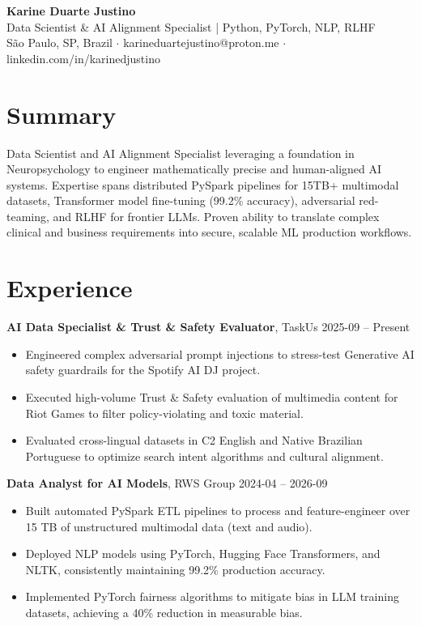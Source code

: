 \documentclass[10pt,a4paper]{article}
\begin{document}
{\LARGE\bfseries Karine Duarte Justino}\\[2pt]
{\large Data Scientist \& AI Alignment Specialist | Python, PyTorch, NLP, RLHF}\\[2pt]
São Paulo, SP, Brazil $\cdot$ karineduartejustino@proton.me $\cdot$ linkedin.com/in/karinedjustino

\section*{Summary}

Data Scientist and AI Alignment Specialist leveraging a foundation in Neuropsychology to engineer mathematically precise and human-aligned AI systems. Expertise spans distributed PySpark pipelines for 15TB+ multimodal datasets, Transformer model fine-tuning (99.2\% accuracy), adversarial red-teaming, and RLHF for frontier LLMs. Proven ability to translate complex clinical and business requirements into secure, scalable ML production workflows.

\section*{Experience}

\textbf{AI Data Specialist \& Trust \& Safety Evaluator}, TaskUs \hfill 2025-09 -- Present\\
\begin{itemize}
  \item Engineered complex adversarial prompt injections to stress-test Generative AI safety guardrails for the Spotify AI DJ project.
  \item Executed high-volume Trust \& Safety evaluation of multimedia content for Riot Games to filter policy-violating and toxic material.
  \item Evaluated cross-lingual datasets in C2 English and Native Brazilian Portuguese to optimize search intent algorithms and cultural alignment.
\end{itemize}

\textbf{Data Analyst for AI Models}, RWS Group \hfill 2024-04 -- 2026-09\\
\begin{itemize}
  \item Built automated PySpark ETL pipelines to process and feature-engineer over 15 TB of unstructured multimodal data (text and audio).
  \item Deployed NLP models using PyTorch, Hugging Face Transformers, and NLTK, consistently maintaining 99.2\% production accuracy.
  \item Implemented PyTorch fairness algorithms to mitigate bias in LLM training datasets, achieving a 40\% reduction in measurable bias.
\end{itemize}
\end{document}
